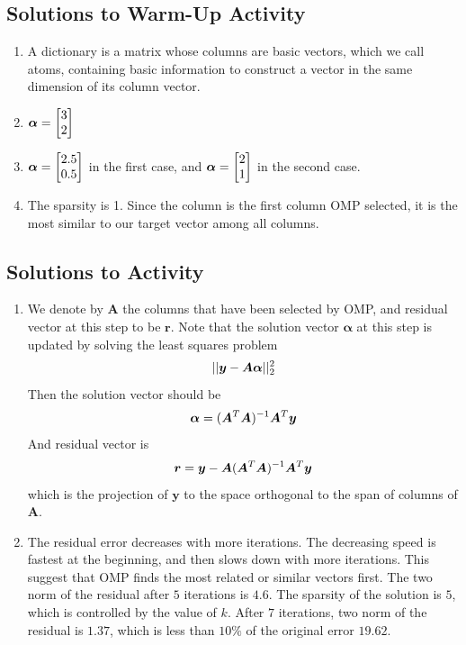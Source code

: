 \documentclass[12pt,letterpaper]{article}
\begin{document}
\subsection*{Solutions to Warm-Up Activity}
\begin{enumerate}[1.]
    \item 

A dictionary is a matrix whose columns are basic vectors, which we call atoms, containing basic information to construct a vector in the same dimension of its column vector.
\item $\bm{\alpha}=\mqty[ 3\\ 2]$
\item $\bm{\alpha}=\mqty[ 2.5\\ 0.5]$ in the first case, and $\bm{\alpha}=\mqty[ 2\\ 1]$ in the second case.
\item The sparsity is 1. Since the column is the first column OMP selected, it is the most similar to our target vector among all columns.
\end{enumerate}
\subsection*{Solutions to Activity}
\begin{enumerate}[1.]
    \item 

We denote by $\bm{A}$ the columns that have been selected by OMP, and residual vector at this step to be $\bm{r}$. Note that the solution vector $\bm{\alpha}$ at this step is updated by solving the least squares problem
\[
||\bm{y}-\bm{A\alpha}||_2^2 \\
\]
Then the solution vector should be
\[
\bm{\alpha} = (\bm{A}^T\bm{A})^{-1}\bm{A}^T\bm{y} \\
\]
And residual vector is
\[
\bm{r} = \bm{y}-\bm{A}(\bm{A}^T\bm{A})^{-1}\bm{A}^T\bm{y} \\
\]
which is the projection of $\bm{y}$ to the space orthogonal to the span of columns of $\bm{A}$.

\item The residual error decreases with more iterations. The decreasing speed is fastest at the beginning, and then slows down with more iterations. This suggest that OMP finds the most related or similar vectors first. The two norm of the residual after $5$ iterations is $4.6$. The sparsity of the solution is $5$, which is controlled by the value of $k$. After $7$ iterations, two norm of the residual is $1.37$, which is less than $10\%$ of the original error $19.62$.
\end{enumerate}
\end{document}
